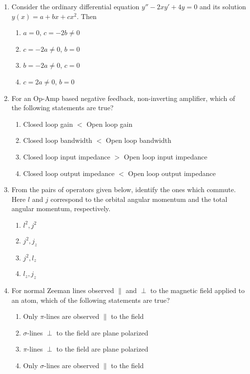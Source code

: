 \documentclass[journal,12pt,onecolumn]{IEEEtran}
\theoremstyle{remark}
\begin{document}
\begin{enumerate}
\item Consider the ordinary differential equation
$y'' - 2xy' + 4y = 0$
and its solution $y(x) = a + bx + cx^2$. Then
\begin{enumerate}
    \item $a = 0$, $c = -2b \neq 0$
    \item $c = -2a \neq 0$, $b = 0$
    \item $b = -2a \neq 0$, $c = 0$
    \item $c = 2a \neq 0$, $b = 0$
\end{enumerate}
\item For an Op-Amp based negative feedback, non-inverting amplifier, which of the following statements are true?
\begin{enumerate}
    \item Closed loop gain $<$ Open loop gain
    \item Closed loop bandwidth $<$ Open loop bandwidth
    \item Closed loop input impedance $>$ Open loop input impedance
    \item Closed loop output impedance $<$ Open loop output impedance
\end{enumerate}

\item From the pairs of operators given below, identify the ones which commute. Here $l$ and $j$ correspond to the orbital angular momentum and the total angular momentum, respectively.
\begin{enumerate}
    \item $l^2, j^2$
    \item $j^2, j_z$
    \item $j^2, l_z$
    \item $l_z, j_z$
\end{enumerate}
\item For normal Zeeman lines observed $\parallel$ and $\perp$ to the magnetic field applied to an atom, which of the following statements are true?
    \begin{enumerate}
        \item Only $\pi$-lines are observed $\parallel$ to the field
        \item $\sigma$-lines $\perp$ to the field are plane polarized
        \item $\pi$-lines $\perp$ to the field are plane polarized
        \item Only $\sigma$-lines are observed $\parallel$ to the field
    \end{enumerate}


\end{enumerate}
\end{document}
